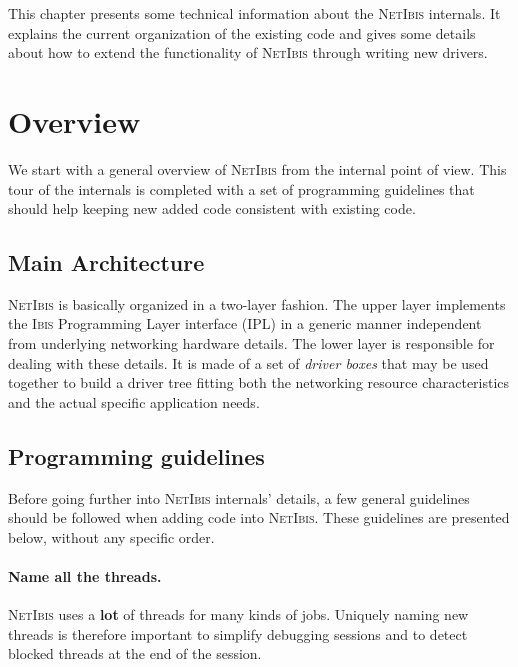 \documentclass[11pt]{book}
\def\Ibis{\textsc{Ibis}\xspace}
\def\NetIbis{\textsc{NetIbis}\xspace}
\begin{document}
This chapter presents some technical information about the \NetIbis
internals. It explains the current organization of the existing code
and gives some details about how to extend the functionality of
\NetIbis through writing new drivers.

\section{Overview}
\label{sec:overview}

We start with a general overview of \NetIbis from the internal point
of view. This tour of the internals is completed with a set of
programming guidelines that should help keeping new added code
consistent with existing code.

\subsection{Main Architecture}
\label{sec:main-architecture}

\NetIbis is basically organized in a two-layer fashion. The upper
layer implements the \Ibis Programming Layer interface (IPL) in a
generic manner independent from underlying networking hardware
details. The lower layer is responsible for dealing with these
details. It is made of a set of \emph{driver boxes} that may be used
together to build a driver tree fitting both the networking resource
characteristics and the actual specific application needs.

\subsection{Programming guidelines}
\label{sec:progr-guid}

Before going further into \NetIbis internals' details, a few general
guidelines should be followed when adding code into \NetIbis. These
guidelines are presented below, without any specific order.


\paragraph{Name all the threads.}
\label{sec:name-all-threads}
\NetIbis uses a \textbf{lot} of threads for many kinds of jobs.
Uniquely naming new threads is therefore important to simplify
debugging sessions and to detect blocked threads at the end of the
session.

\end{document}
